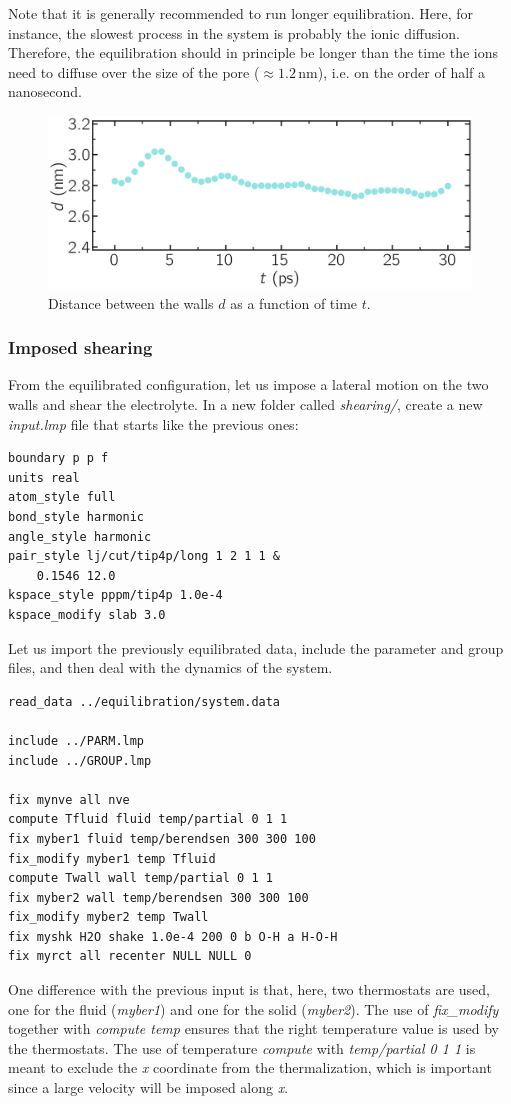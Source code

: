 \documentclass[9pt,tutorial]{livecoms}
\begin{document}
Note that it is generally recommended to run longer equilibration. Here, for
instance, the slowest process in the system is probably the ionic diffusion.
Therefore, the equilibration should in principle be longer than the time
the ions need to diffuse over the size of the pore ($\approx 1.2\,\text{nm}$),
i.e. on the order of half a nanosecond.

\begin{figure}
\centering
\includegraphics[width=\linewidth]{NANOSHEAR-equilibration}
\caption{Distance between the walls $d$ as a function of time $t$.}
\label{fig:NANOSHEAR-equilibration}
\end{figure}

\subsubsection{Imposed shearing}

From the equilibrated configuration, let us impose a lateral motion on the two
walls and shear the electrolyte. In a new folder called \textit{shearing/},
create a new \textit{input.lmp} file that starts like the previous ones:
{\normalsize \begin{verbatim}
boundary p p f
units real
atom_style full
bond_style harmonic
angle_style harmonic
pair_style lj/cut/tip4p/long 1 2 1 1 &
    0.1546 12.0
kspace_style pppm/tip4p 1.0e-4
kspace_modify slab 3.0
\end{verbatim}}
Let us import the previously equilibrated data, include the parameter and group
files, and then deal with the dynamics of the system.
{\normalsize \begin{verbatim}
read_data ../equilibration/system.data

include ../PARM.lmp
include ../GROUP.lmp

fix mynve all nve
compute Tfluid fluid temp/partial 0 1 1
fix myber1 fluid temp/berendsen 300 300 100
fix_modify myber1 temp Tfluid
compute Twall wall temp/partial 0 1 1
fix myber2 wall temp/berendsen 300 300 100
fix_modify myber2 temp Twall
fix myshk H2O shake 1.0e-4 200 0 b O-H a H-O-H
fix myrct all recenter NULL NULL 0
\end{verbatim}}
One difference with the previous input is that, here, two thermostats are used,
one for the fluid (\textit{myber1}) and one for the solid (\textit{myber2}).
The use of \textit{fix\_modify} together with \textit{compute temp} ensures
that the right temperature value is used by the thermostats. The use of
temperature \textit{compute} with \textit{temp/partial 0 1 1} is meant to exclude
the \textit{x} coordinate from the thermalization, which is important since a
large velocity will be imposed along \textit{x}.
\end{document}
